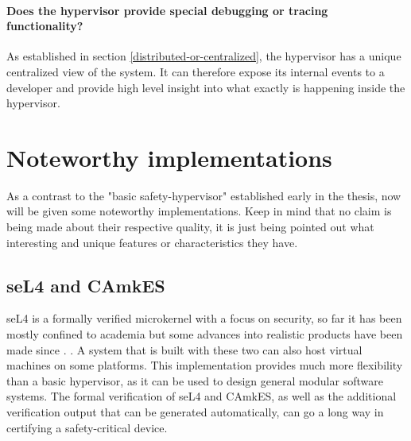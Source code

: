 \paragraph{Does the hypervisor provide special debugging or tracing functionality?}
As established in section \ref{distributed-or-centralized}, the hypervisor has a unique centralized view of the system. It can therefore expose its internal events to a developer and provide high level insight into what exactly is happening inside the hypervisor.


\section{Noteworthy implementations} \label{noteworthy-implementations}
As a contrast to the "basic safety-hypervisor" established early in the thesis, now will be given some noteworthy implementations. Keep in mind that no claim is being made about their respective quality, it is just being pointed out what interesting and unique features or characteristics they have.
\subsection{seL4 and CAmkES} \label{seL4}
seL4 is a formally verified microkernel with a focus on security, so far it has been mostly confined to academia but some advances into realistic products have been made since \cite{fisher2012hacms}. \cite{camkes}. A system that is built with these two can also host virtual machines on some platforms. This implementation provides much more flexibility than a basic hypervisor, as it can be used to design general modular software systems. The formal verification of seL4 and CAmkES, as well as the additional verification output that can be generated automatically, can go a long way in certifying a safety-critical device.

